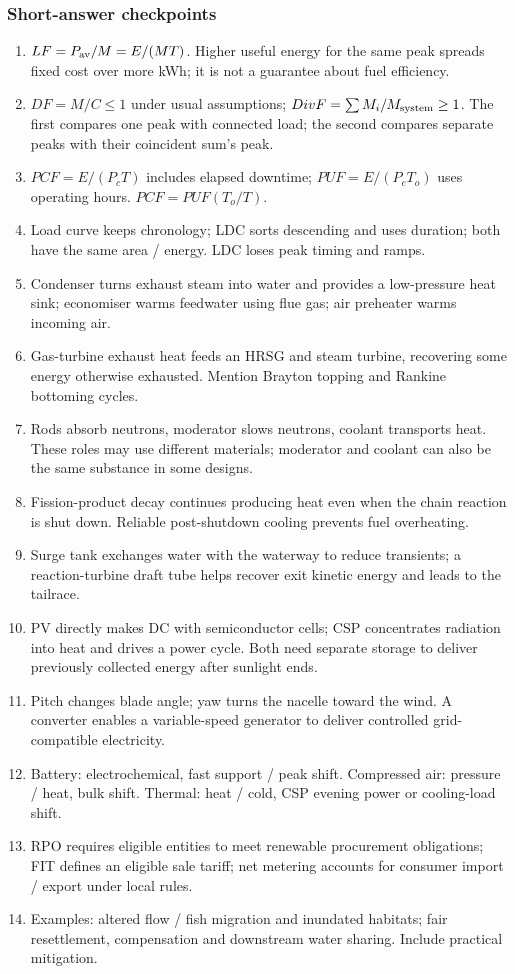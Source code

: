 \documentclass[11pt,a4paper]{article}
\begin{document}
\subsubsection{Short-answer checkpoints}
\begin{enumerate}[label=\textbf{S\arabic*.}]
\item $LF=P_{\rm av}/M=E/(MT)$. Higher useful energy for the same peak spreads fixed cost over more kWh; it is not a guarantee about fuel efficiency.
\item $DF=M / C\le1$ under usual assumptions; $DivF=\sum M_i / M_{\rm system}\ge1$. The first compares one peak with connected load; the second compares separate peaks with their coincident sum's peak.
\item $PCF=E/(P_cT)$ includes elapsed downtime; $PUF=E/(P_cT_o)$ uses operating hours. $PCF=PUF(T_o / T)$.
\item Load curve keeps chronology; LDC sorts descending and uses duration; both have the same area / energy. LDC loses peak timing and ramps.
\item Condenser turns exhaust steam into water and provides a low-pressure heat sink; economiser warms feedwater using flue gas; air preheater warms incoming air.
\item Gas-turbine exhaust heat feeds an HRSG and steam turbine, recovering some energy otherwise exhausted. Mention Brayton topping and Rankine bottoming cycles.
\item Rods absorb neutrons, moderator slows neutrons, coolant transports heat. These roles may use different materials; moderator and coolant can also be the same substance in some designs.
\item Fission-product decay continues producing heat even when the chain reaction is shut down. Reliable post-shutdown cooling prevents fuel overheating.
\item Surge tank exchanges water with the waterway to reduce transients; a reaction-turbine draft tube helps recover exit kinetic energy and leads to the tailrace.
\item PV directly makes DC with semiconductor cells; CSP concentrates radiation into heat and drives a power cycle. Both need separate storage to deliver previously collected energy after sunlight ends.
\item Pitch changes blade angle; yaw turns the nacelle toward the wind. A converter enables a variable-speed generator to deliver controlled grid-compatible electricity.
\item Battery: electrochemical, fast support / peak shift. Compressed air: pressure / heat, bulk shift. Thermal: heat / cold, CSP evening power or cooling-load shift.
\item RPO requires eligible entities to meet renewable procurement obligations; FIT defines an eligible sale tariff; net metering accounts for consumer import / export under local rules.
\item Examples: altered flow / fish migration and inundated habitats; fair resettlement, compensation and downstream water sharing. Include practical mitigation.
\end{enumerate}
\end{document}
